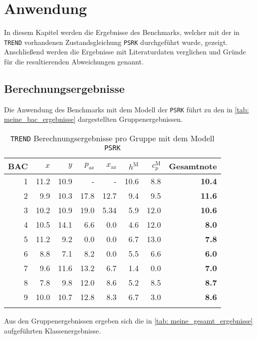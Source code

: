 \documentclass[../thesis.tex]{subfiles}
\begin{document}
\chapter{Anwendung}

In diesem Kapitel werden die Ergebnisse des Benchmarks, welcher mit der in \texttt{TREND} vorhandenen Zustandsgleichung \texttt{PSRK} durchgeführt wurde, gezeigt. Anschließend werden die Ergebnisse mit Literaturdaten verglichen und Gründe für die resultierenden Abweichungen genannt.

\section{Berechnungsergebnisse}

Die Anwendung des Benchmarks mit dem Modell der \texttt{PSRK} führt zu den in \autoref{tab: meine_bac_ergebnisse} dargestellten Gruppenergebnissen.

\begin{table} [htb]
	\centering
	\caption{\texttt{TREND} Berechnungsergebnisse pro Gruppe mit dem Modell \texttt{PSRK}}
	\begin{tabular}{ rrrrrrrr }
		\hline
		BAC & $ x $ & $ y $ & $ p_\mathrm{az}$ & $ x_\mathrm{az}$ & $ h^\mathrm{M} $ & $ c_p^\mathrm{M} $ & \textbf{Gesamtnote} \\
		\hline
		1 & 11.2  & 10.9 & -     & -     & 10.6 & 8.8  & \textbf{10.4}\\
		2 & 9.9   & 10.3 & 17.8  & 12.7 & 9.4  & 9.5  & \textbf{11.6}\\
		3 & 10.2  & 10.9 & 19.0  & 5.34 & 5.9  & 12.0 & \textbf{10.6}\\
		4 & 10.5  & 14.1 & 6.6   & 0.0   & 4.6  & 12.0  & \textbf{8.0}\\
		5 & 11.2  & 9.2  & 0.0   & 0.0   & 6.7  & 13.0 & \textbf{7.8}\\
		6 & 8.8   & 7.1  & 8.2   & 0.0  & 5.5  & 6.6  & \textbf{6.0}\\
		7 & 9.6   & 11.6 & 13.2  & 6.7  & 1.4  & 0.0   & \textbf{7.0}\\
		8 & 7.8  & 9.8  & 12.0  & 8.6  & 5.2  & 8.5  & \textbf{8.7}\\
		9 & 10.0  & 10.7 & 12.8 & 8.3  & 6.7  & 3.0  & \textbf{8.6}\\
		\hline
		\label{tab: meine_bac_ergebnisse}
	\end{tabular}
\end{table}


Aus den Gruppenergebnissen ergeben sich die in \autoref{tab: meine_gesamt_ergebnisse} aufgeführten Klassenergebnisse.
\end{document}

